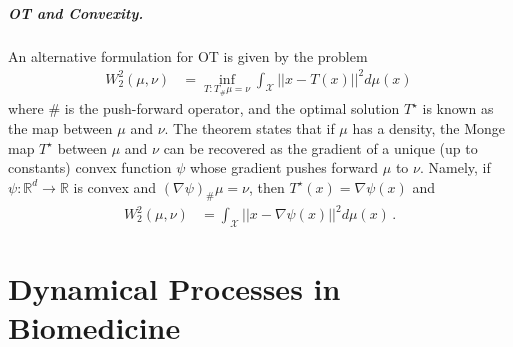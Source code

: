 \paragraph{OT and Convexity.} 
An alternative formulation for OT is given by the \citet{Monge1781} problem  
\begin{align}\label{eq:monge}
W_2^2(\mu,\nu) &= \inf_{T:T_{\#} \mu = \nu} \int_\mathcal{X} ||x - T(x)||^2d\mu(x) \,
\end{align}
where $\#$ is the push-forward operator, and the optimal solution $T^\star$ is known as the \citeauthor{Monge1781} map between $\mu$ and $\nu$. The \citeauthor{Brenier1987} theorem \citeyear{Brenier1987} states that if $\mu$ has a density, the Monge map $T^\star$ between $\mu$ and $\nu$ can be recovered as the gradient of a unique (up to constants) convex function $\psi$ whose gradient pushes forward $\mu$ to $\nu$. Namely, if $\psi:\mathbb{R}^d \rightarrow \mathbb{R}$ is convex and $(\nabla \psi)_{\#}\mu = \nu$, then $T^\star(x)=\nabla \psi(x)$ and
\begin{align}\label{eq:brenier}
W_2^2(\mu,\nu) &= \int_\mathcal{X} ||x - \nabla \psi(x)||^2 d\mu(x)\,.
\end{align}



\chapter{Dynamical Processes in Biomedicine}
\label{cha:bio_background}

%
